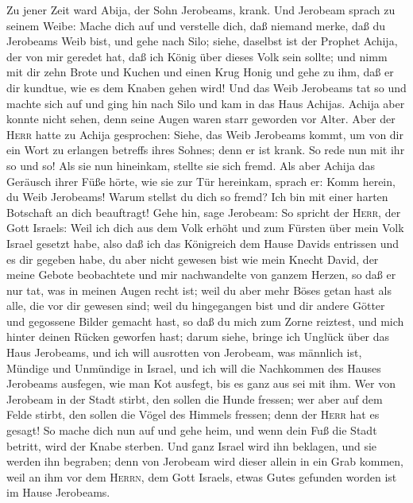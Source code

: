  Zu jener Zeit ward Abija, der Sohn Jerobeams, krank.
 Und Jerobeam sprach zu seinem Weibe: Mache dich auf und
verstelle dich, daß niemand merke, daß du Jerobeams Weib bist, und gehe
nach Silo; siehe, daselbst ist der Prophet Achija, der von mir geredet
hat, daß ich König über dieses Volk sein sollte;  und nimm
mit dir zehn Brote und Kuchen und einen Krug Honig und gehe zu ihm, daß
er dir kundtue, wie es dem Knaben gehen wird!  Und das
Weib Jerobeams tat so und machte sich auf und ging hin nach Silo und kam
in das Haus Achijas. Achija aber konnte nicht sehen, denn seine Augen
waren starr geworden vor Alter.  Aber der \textsc{Herr}
hatte zu Achija gesprochen: Siehe, das Weib Jerobeams kommt, um von dir
ein Wort zu erlangen betreffs ihres Sohnes; denn er ist krank. So rede
nun mit ihr so und so! Als sie nun hineinkam, stellte sie sich fremd.
 Als aber Achija das Geräusch ihrer Füße hörte, wie sie
zur Tür hereinkam, sprach er: Komm herein, du Weib Jerobeams! Warum
stellst du dich so fremd? Ich bin mit einer harten Botschaft an dich
beauftragt!  Gehe hin, sage Jerobeam: So spricht der
\textsc{Herr}, der Gott Israels: Weil ich dich aus dem Volk erhöht und
zum Fürsten über mein Volk Israel gesetzt habe,  also daß
ich das Königreich dem Hause Davids entrissen und es dir gegeben habe,
du aber nicht gewesen bist wie mein Knecht David, der meine Gebote
beobachtete und mir nachwandelte von ganzem Herzen, so daß er nur tat,
was in meinen Augen recht ist;  weil du aber mehr Böses
getan hast als alle, die vor dir gewesen sind; weil du hingegangen bist
und dir andere Götter und gegossene Bilder gemacht hast, so daß du mich
zum Zorne reiztest, und mich hinter deinen Rücken geworfen hast;
 darum siehe, bringe ich Unglück über das Haus Jerobeams,
und ich will ausrotten von Jerobeam, was männlich ist, Mündige und
Unmündige in Israel, und ich will die Nachkommen des Hauses Jerobeams
ausfegen, wie man Kot ausfegt, bis es ganz aus sei mit ihm.
 Wer von Jerobeam in der Stadt stirbt, den sollen die
Hunde fressen; wer aber auf dem Felde stirbt, den sollen die Vögel des
Himmels fressen; denn der \textsc{Herr} hat es gesagt! 
So mache dich nun auf und gehe heim, und wenn dein Fuß die Stadt
betritt, wird der Knabe sterben.  Und ganz Israel wird
ihn beklagen, und sie werden ihn begraben; denn von Jerobeam wird dieser
allein in ein Grab kommen, weil an ihm vor dem \textsc{Herrn}, dem Gott
Israels, etwas Gutes gefunden worden ist im Hause Jerobeams.
